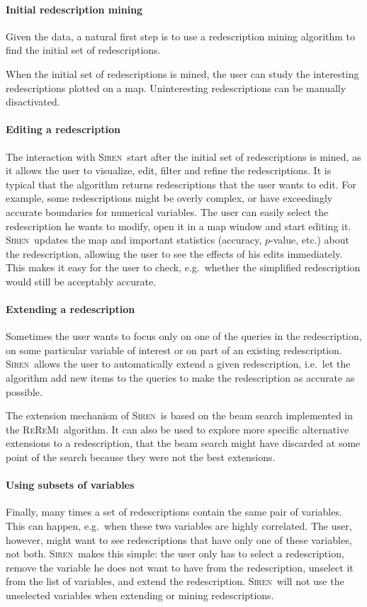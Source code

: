 \documentclass{sig-alternate}
\newcommand{\prg}[1]{\paragraph{#1}}
\newcommand{\Siren}{\textsc{Siren}}
\newcommand{\ReReMi}{\textsc{ReReMi}}
\begin{document}
\prg{Initial redescription mining}
Given the data, a natural first step is to use a redescription mining
algorithm to find the initial set of redescriptions. 

When the initial set of redescriptions is mined, the user can study the
interesting redescriptions plotted on a map.
Uninteresting redescriptions can be manually disactivated.
 
\prg{Editing a redescription} 
The interaction with \Siren\ start after the initial set of
redescriptions is mined, as it allows the user to visualize, edit,
filter and refine the redescriptions.  It is typical that the
algorithm returns redescriptions that the user wants to edit. For
example, some redescriptions might be overly complex, or have
exceedingly accurate boundaries for numerical variables. The user can
easily select the redescription he wants to modify, open it in a map
window and start editing it. \Siren\ updates the map and important
statistics (accuracy, $p$-value, etc.) about the redescription,
allowing the user to see the effects of his edits immediately. This
makes it easy for the user to check, e.g.\ whether the simplified
redescription would still be acceptably accurate.


\prg{Extending a redescription}
Sometimes the user wants to focus only on one of the queries in the
redescription, on some particular variable of interest or on part of an existing redescription. 
\Siren\ allows the user to automatically extend a given
redescription, i.e.\ let the algorithm add new items to the queries to
make the redescription as accurate as possible.

The extension mechanism of \Siren\ is based on the beam search implemented in
the \ReReMi\ algorithm.  It can also be used to explore more specific
alternative extensions to a redescription, that the beam search might
have discarded at some point of the search because they were not the
best extensions.





\prg{Using subsets of variables}
Finally, many times a set of redescriptions contain the same pair of
variables. This can happen, e.g.\ when these two variables are highly
correlated. The user, however, might want to see redescriptions that have
only one of these variables, not both. \Siren\ makes this simple: the user
only has to select a redescription, remove the variable he does not
want to have from the redescription, unselect it from the list of variables, and
extend the redescription. \Siren\ will not use the unselected
variables when extending or mining redescriptions.
\end{document}
